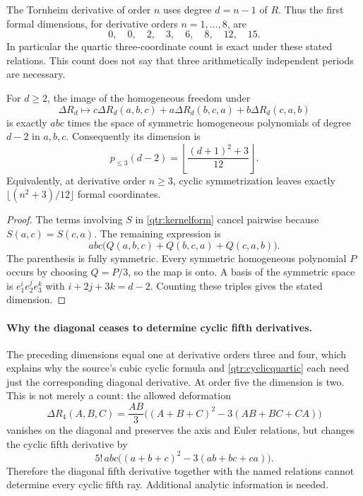 The Tornheim derivative of order \(n\) uses degree \(d=n-1\)
of \(R\). Thus the first formal dimensions, for derivative
orders \(n=1,\ldots,8\), are
\[
 0,\quad0,\quad2,\quad3,\quad6,\quad8,\quad12,\quad15.
\]
In particular the quartic three-coordinate count is exact under
these stated relations. This count does not say that three
arithmetically independent periods are necessary.

\begin{corollary}
\label{qtr:cyclicimage}
For \(d\ge2\), the image of the homogeneous freedom under
\[
 \Delta R_d\longmapsto
 c\Delta R_d(a,b,c)+a\Delta R_d(b,c,a)
                         +b\Delta R_d(c,a,b)
\]
is exactly \(abc\) times the space of symmetric homogeneous
polynomials of degree \(d-2\) in \(a,b,c\). Consequently its
dimension is
\[
 p_{\le3}(d-2)=
 \left\lfloor\frac{(d+1)^2+3}{12}\right\rfloor.
\]
Equivalently, at derivative order \(n\ge3\), cyclic
symmetrization leaves exactly
\(\lfloor(n^2+3)/12\rfloor\) formal coordinates.
\end{corollary}

\begin{proof}
The terms involving \(S\) in \eqref{qtr:kernelform} cancel
pairwise because \(S(a,c)=S(c,a)\). The remaining expression is
\[
 abc\bigl(Q(a,b,c)+Q(b,c,a)+Q(c,a,b)\bigr).
\]
The parenthesis is fully symmetric. Every symmetric
homogeneous polynomial \(P\) occurs by choosing \(Q=P/3\),
so the map is onto. A basis of the symmetric space is
\(e_1^i e_2^j e_3^k\) with \(i+2j+3k=d-2\).
Counting these triples gives the stated dimension.
\end{proof}

\paragraph{Why the diagonal ceases to determine cyclic fifth derivatives.}
The preceding dimensions equal one at derivative orders three
and four, which explains why the source's cubic cyclic formula
and \eqref{qtr:cyclicquartic} each need just the corresponding
diagonal derivative. At order five the dimension is two.
This is not merely a count: the allowed deformation
\[
 \Delta R_4(A,B,C)=\frac{AB}{3}
 \bigl((A+B+C)^2-3(AB+BC+CA)\bigr)
\]
vanishes on the diagonal and preserves the axis and Euler
relations, but changes the cyclic fifth derivative by
\[
 5!\,abc\bigl((a+b+c)^2-3(ab+bc+ca)\bigr).
\]
Therefore the diagonal fifth derivative together with the
named relations cannot determine every cyclic fifth ray.
Additional analytic information is needed.

